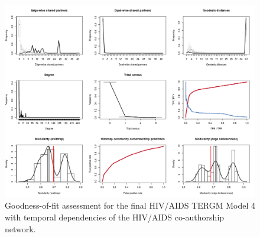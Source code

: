 \begin{figure}[!h]
\centering
\includegraphics[scale=0.55]{Chapters/hiv/statMod/tergm_gof}
\caption{Goodness-of-fit assessment for the final HIV/AIDS TERGM Model 4 with temporal dependencies of the HIV/AIDS co-authorship network.}
\label{fig:hiv_tergm-gof}
\end{figure}

\pagebreak
\pagebreak
